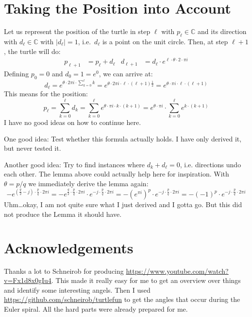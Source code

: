 \documentclass[pdftex,a4paper]{scrartcl}
\begin{document}
\section{Taking the Position into Account}
Let us represent the position of the turtle in step \(\ell\) with \(p_\ell\in\mathbb{C}\) and its direction with
\(d_\ell\in\mathbb{C}\) with \(|d_\ell|=1\), i.e.\ \(d_\ell\) is a point on the unit circle. Then, at step \(\ell+1\), the turtle
will do:
\begin{align*}
p_{\ell+1} &= p_\ell + d_\ell &
d_{\ell+1} &= d_\ell \cdot e^{\ell\cdot \theta\cdot 2\cdot \pi i}
\end{align*}
Defining \(p_0=0\) and \(d_0=1=e^0\), we can arrive at:
\[
d_\ell = e^{\theta\cdot 2\pi i\cdot \sum_{k=0}^\ell k}
= e^{\theta\cdot 2\pi i \cdot \ell\cdot(\ell+1)\frac{1}{2}}
= e^{\theta\cdot \pi i \cdot \ell\cdot(\ell+1)}
\]
This means for the position:
\[
p_\ell = \sum_{k=0}^\ell d_k
= \sum_{k=0}^\ell e^{\theta\cdot \pi i\cdot k\cdot(k+1)}
= e^{\theta\cdot\pi i}\cdot \sum_{k=0}^\ell e^{k\cdot(k+1)}
\]
I have no good ideas on how to continue here.

One good idea: Test whether this formula actually holds. I have only derived it, but never tested it.

Another good idea: Try to find instances where \(d_k+d_\ell=0\), i.e. directions undo each other. The lemma above could
actually help here for inspiration. With \(\theta=p/q\) we immediately derive the lemma again:
\[
-e^{(\frac{q}{2}-j)\cdot\frac{p}{q}\cdot 2\pi i}
= -e^{\frac{q}{2}\cdot\frac{p}{q}\cdot 2\pi i} \cdot e^{-j\cdot\frac{p}{q}\cdot 2\pi i}
= -\left(e^{\pi i}\right)^p \cdot e^{-j\cdot\frac{p}{q}\cdot 2\pi i}
= -\left(-1\right)^p \cdot e^{-j\cdot\frac{p}{q}\cdot 2\pi i}
\]
Uhm\dots okay, I am not quite sure what I just derived and I gotta go. But this did not produce the Lemma it should
have.

\section{Acknowledgements}
Thanks a lot to Schneirob for producing \url{https://www.youtube.com/watch?v=Fx1d8x0gIu4}. This made it really easy for
me to get an overview over things and identify some interesting angels. Then I used
\url{https://github.com/schneirob/turtlefun} to get the angles that occur during the Euler spiral. All the hard parts
were already prepared for me.
\end{document}
